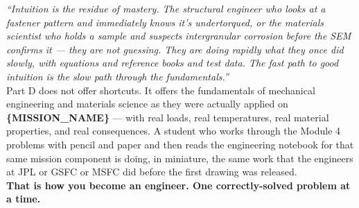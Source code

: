 \documentclass[11pt,letterpaper]{article}
\newcommand{\param}[1]{\textcolor{paramred}{\textbf{\{#1\}}}}
\begin{document}
\begin{quotebox}
\textit{``Intuition is the residue of mastery. The structural engineer who looks at a fastener pattern and immediately knows it's undertorqued, or the materials scientist who holds a sample and suspects intergranular corrosion before the SEM confirms it --- they are not guessing. They are doing rapidly what they once did slowly, with equations and reference books and test data. The fast path to good intuition is the slow path through the fundamentals.''}\\[0.6em]
Part D does not offer shortcuts. It offers the fundamentals of mechanical engineering and materials science as they were actually applied on \param{MISSION\_NAME} --- with real loads, real temperatures, real material properties, and real consequences. A student who works through the Module 4 problems with pencil and paper and then reads the engineering notebook for that same mission component is doing, in miniature, the same work that the engineers at JPL or GSFC or MSFC did before the first drawing was released.\\[0.6em]
\textbf{That is how you become an engineer. One correctly-solved problem at a time.}
\end{quotebox}
\end{document}
